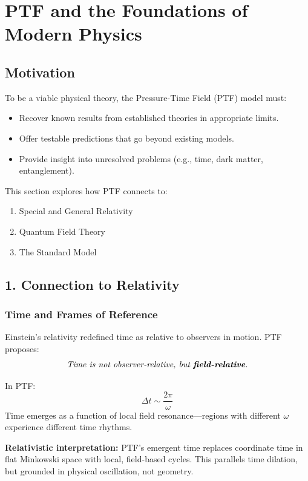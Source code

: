 \documentclass[a4paper,12pt]{article}
\begin{document}
\section{PTF and the Foundations of Modern Physics}
\label{sec:relativity_quantum}

\subsection{Motivation}

To be a viable physical theory, the Pressure-Time Field (PTF) model must:
\begin{itemize}
    \item Recover known results from established theories in appropriate limits.
    \item Offer testable predictions that go beyond existing models.
    \item Provide insight into unresolved problems (e.g., time, dark matter, entanglement).
\end{itemize}

This section explores how PTF connects to:
\begin{enumerate}
    \item Special and General Relativity
    \item Quantum Field Theory
    \item The Standard Model
\end{enumerate}

\subsection{1. Connection to Relativity}

\subsubsection*{Time and Frames of Reference}

Einstein’s relativity redefined time as relative to observers in motion.  
PTF proposes:
\[
\textit{Time is not observer-relative, but \textbf{field-relative}.}
\]

In PTF:
\[
\Delta t \sim \frac{2\pi}{\omega}
\]
Time emerges as a function of local field resonance—regions with different $\omega$ experience different time rhythms.

\textbf{Relativistic interpretation:}  
PTF’s emergent time replaces coordinate time in flat Minkowski space with local, field-based cycles. This parallels time dilation, but grounded in physical oscillation, not geometry.
\end{document}
